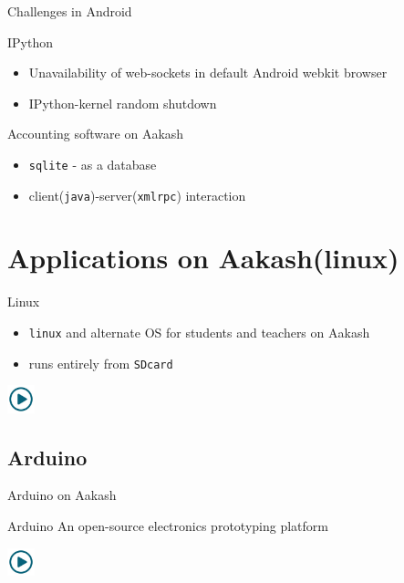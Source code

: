 \documentclass{beamer}
\begin{document}
  \begin{frame}{Challenges in Android}
    \begin{block}{IPython}
      \begin{itemize}
        \item Unavailability of web-sockets in default Android webkit
          browser
        \item IPython-kernel random shutdown
      \end{itemize}
    \end{block}
    \begin{block}{Accounting software on Aakash}
      \begin{itemize}
        \item {\tt sqlite} - as a database 
        \item client({\tt java})-server({\tt xmlrpc}) interaction
      \end{itemize}
    \end{block}
  \end{frame}
\section{Applications on Aakash(linux)}
\begin{frame}{Linux}
  \begin{block}{}
    \begin{itemize}
    \item {\tt linux} and alternate OS for students and teachers on
      Aakash
    \item runs entirely from {\tt SDcard}
    \end{itemize}
  \end{block}
  \centerline{\href{file:///home/sachin/github/slides/techfest2013/linux.3gp}{\includegraphics[height=0.8cm,width=0.8cm]{play.jpg}}}
\end{frame}

\subsection{Arduino}
\begin{frame}{Arduino on Aakash}
  \begin{block}{Arduino}
    An open-source electronics prototyping platform
  \end{block}
  \centerline{\href{file:///home/sachin/github/slides/techfest2013/arduino.3gp}{\includegraphics[height=0.8cm,width=0.8cm]{play.jpg}}}
\end{frame}
\end{document}
